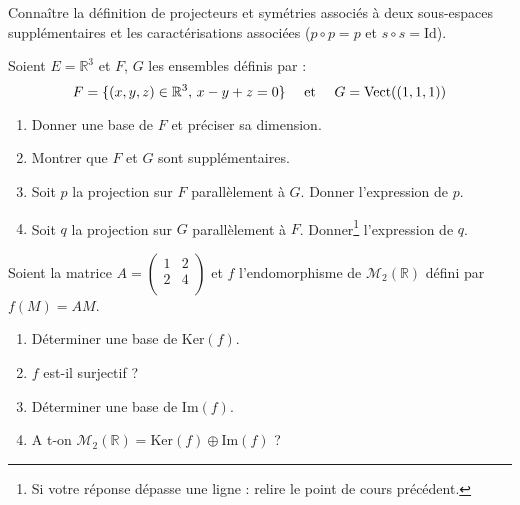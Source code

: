 \documentclass[a4paper,twoside,french,10pt]{VcCours}
\begin{document}
\medskip

\begin{ptc}{}
	Connaître la définition de projecteurs et symétries associés à deux sous-espaces supplémentaires et les caractérisations associées ($p \circ p = p$ et $s \circ s = \textrm{Id}$).
\end{ptc} 


\medskip

\begin{Exercice}{}\end{Exercice} Soient $E= \mathbb{R}^3$ et $F$, $G$ les ensembles définis par :
$$ F = \lbrace (x,y,z) \in \mathbb{R}^3, \, x-y+z=0 \rbrace \quad \hbox{ et }  \quad G = \textrm{Vect}((1,1,1)) $$

\begin{enumerate}
\item Donner une base de $F$ et préciser sa dimension.
\item Montrer que $F$ et $G$ sont supplémentaires.
\item Soit $p$ la projection sur $F$ parallèlement à $G$. Donner l'expression de $p$.
\item Soit $q$ la projection sur $G$ parallèlement à $F$. Donner\footnote{Si votre réponse dépasse une ligne : relire le point de cours précédent.} l'expression de $q$.
\end{enumerate}

%



\medskip

\begin{Exercice}{}\end{Exercice} Soient la matrice $A= \begin{pmatrix}
1 & 2 \\
2 & 4 \\
\end{pmatrix}$ et $f$ l'endomorphisme de $\mathcal{M}_2(\mathbb{R})$ défini par $f(M)=AM$.

\begin{enumerate}
\item Déterminer une base de $\textrm{Ker}(f)$.
\item $f$ est-il surjectif ?
\item Déterminer une base de $\textrm{Im}(f)$.
\item A t-on $\mathcal{M}_2(\mathbb{R}) = \textrm{Ker}(f) \oplus \textrm{Im}(f)$ ?
\end{enumerate}
\end{document}
